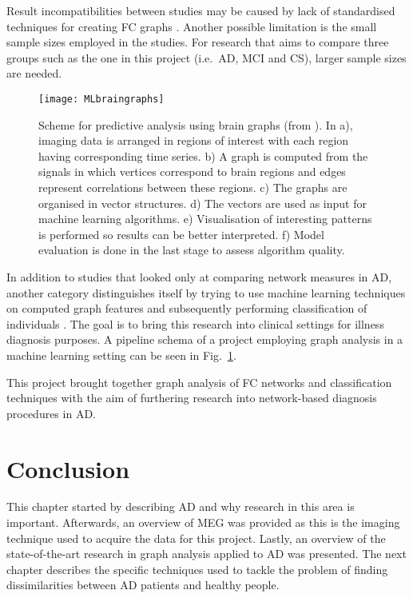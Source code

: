 	Result incompatibilities between studies may be caused by lack of standardised techniques for creating \ac{FC} graphs \autocite{Tijms2013}. Another possible limitation is the small sample sizes employed in the studies. For research that aims to compare three groups such as the one in this project (i.e.\ \ac{AD}, \ac{MCI} and \ac{CS}), larger sample sizes are needed.  


	\begin{figure}
		    \centering
		    \texttt{[image: MLbraingraphs]}
		    \caption{Scheme for predictive analysis using brain graphs (from \textcite{Richiardi2013}). In a), imaging data is arranged in regions of interest with each region having corresponding time series. b) A graph is computed from the signals in which vertices correspond to brain regions and edges represent correlations between these regions. c) The graphs are organised in vector structures. d) The vectors are used as input for machine learning algorithms. e) Visualisation of interesting patterns is performed so results can be better interpreted. f) Model evaluation is done in the last stage to assess algorithm quality.}
		    \label{fig:MLbraingraphs}
	\end{figure}

	In addition to studies that looked only at comparing network measures in \ac{AD}, another category distinguishes itself by trying to use machine learning techniques on computed graph features and subsequently performing classification of individuals \autocite{Jie2014,Chen2011,Zhou2011}. The goal is to bring this research into clinical settings for illness diagnosis purposes. A pipeline schema of a project employing graph analysis in a machine learning setting can be seen in Fig.~\ref{fig:MLbraingraphs}. 


	This project brought together graph analysis of \ac{FC} networks and classification techniques with the aim of furthering research into network-based diagnosis procedures in \ac{AD}.

\section*{Conclusion}
	This chapter started by describing \ac{AD} and why research in this area is important. Afterwards, an overview of \ac{MEG} was provided as this is the imaging technique used to acquire the data for this project. Lastly, an overview of the state-of-the-art research in graph analysis applied to \ac{AD} was presented. The next chapter describes the specific techniques used to tackle the problem of finding dissimilarities between \ac{AD} patients and healthy people.